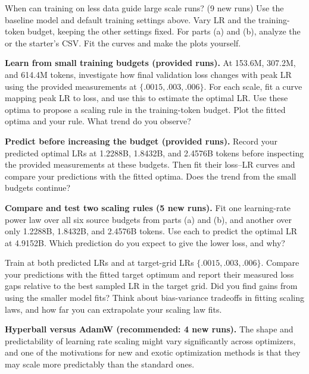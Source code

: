 \begin{problem}{When can training on less data guide large scale runs? (9 new runs)}
Use the baseline model and default training settings above. Vary LR and the
training-token budget, keeping the other settings fixed.
For parts (a) and (b), analyze the \providedSweeps{} or the starter's CSV.
Fit the curves and make the plots yourself.

\begin{parts}
\item \textbf{Learn from small training budgets (provided runs).}
At 153.6M, 307.2M, and 614.4M tokens, investigate how final validation loss
changes with peak LR using the provided measurements at $\{.0015,.003,.006\}$. For each scale, fit a curve mapping peak LR to loss, and use this to estimate
the optimal LR. Use these optima to propose a scaling rule in the training-token budget.
Plot the fitted optima and your rule. What trend do you observe?

\item \textbf{Predict before increasing the budget (provided runs).}
Record your predicted optimal LRs at 1.2288B, 1.8432B, and 2.4576B tokens
before inspecting the provided measurements at these budgets.
Then fit their loss--LR curves and compare your predictions with the fitted optima. Does the trend from the small budgets continue?

\item \textbf{Compare and test two scaling rules (5 new runs).}
Fit one learning-rate power law over all six source budgets from parts (a) and (b),
and another over only 1.2288B, 1.8432B, and 2.4576B tokens.
Use each to predict the optimal LR at 4.9152B. Which prediction do you expect
to give the lower loss, and why?

Train at both predicted LRs and at target-grid LRs $\{.0015,.003,.006\}$.
Compare your predictions with the fitted target optimum and report their measured
loss gaps relative to the best sampled LR in the target grid. Did you find gains from using the smaller model fits? Think about bias-variance tradeoffs in fitting scaling laws, and how far you can extrapolate your scaling law fits.

\item \textbf{Hyperball versus AdamW (recommended: 4 new runs).}
The shape and predictability of learning rate scaling might vary significantly across optimizers, and one of the motivations for new and exotic optimization methods is that they may scale more predictably than the standard ones.


\end{parts}
\end{problem}
